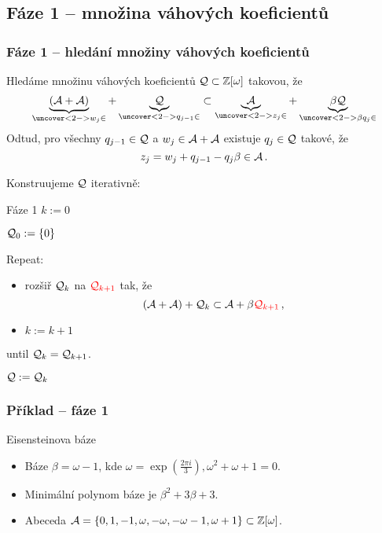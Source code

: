 \documentclass[11pt]{beamer}
\begin{document}
\subsection{Fáze 1 -- množina váhových koeficientů}
\begin{frame}
    \frametitle{Fáze 1 -- hledání množiny váhových koeficientů}
    Hledáme množinu váhových koeficientů $\mathcal{Q} \subset \mathbb{Z}[\omega]$ takovou, že
    $$
    \underbrace{(\A+\A)}_{\uncover<2->{w_j \in}}+ \underbrace{\Q}_{\uncover<2->{q_{j-1} \in}} \subset \underbrace{\A}_{\uncover<2->{z_j \in}} + \underbrace{\beta \Q}_{\uncover<2->{\beta q_j \in}}
    $$
    \pause
    Odtud, pro všechny $q_{j-1} \in \mathcal{Q}$ a $w_j \in \mathcal{A}+\mathcal{A}$ existuje $q_j \in \mathcal{Q}$ takové, že
    $$
    z_j=w_j + q_{j-1} - q_j \beta \in \mathcal{A} \,.
    $$
\end{frame}


\begin{frame}
    Konstruujeme $\mathcal{Q}$ iterativně:
    \begin{block}{Fáze 1}
     $k:=0$
     
    $\mathcal{Q}_0:=\{0\}$
      
      \pause
      Repeat:
      \begin{itemize}
          \item rozšiř $\mathcal{Q}_k$ na $\textcolor{red}{\mathcal{Q}_{k+1}}$ tak, že
           $$
              (\mathcal{A}+\mathcal{A})+ \mathcal{Q}_k \subset \mathcal{A} + \beta \textcolor{red}{\mathcal{Q}_{k+1}}\,,
           $$
           \item $k:=k+1$
      \end{itemize}
      \pause
      until $\mathcal{Q}_k = \mathcal{Q}_{k+1}$.
      
      \pause
      \vspace{7pt}
      $\mathcal{Q}:=\mathcal{Q}_k$
    \end{block}
\end{frame}

\begin{frame}
    \frametitle{Příklad -- fáze 1}
    \begin{block}{Eisensteinova báze}
        \begin{itemize}
            \item Báze $\beta = \omega - 1 $, kde $\omega=\exp(\frac{2 \pi i}{3}), \omega^2+\omega+1=0$.
            \item Minimální polynom báze je $ \beta^{2} + 3\beta + 3 $.
            \item Abeceda $ \mathcal{A}=\left\{0, 1, -1, \omega, -\omega, -\omega - 1, \omega + 1\right\} \subset \mathbb{Z}[\omega]$.
        \end{itemize}
    \end{block}
\end{frame}
\end{document}

